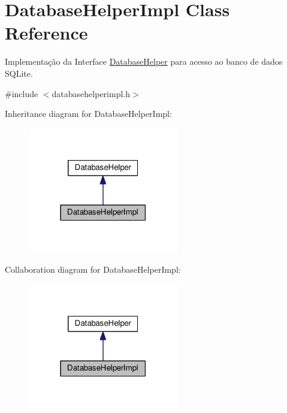 \hypertarget{classDatabaseHelperImpl}{}\section{Database\+Helper\+Impl Class Reference}
\label{classDatabaseHelperImpl}


Implementação da Interface \hyperlink{classDatabaseHelper}{Database\+Helper} para acesso ao banco de dados S\+Q\+Lite.  




{\ttfamily \#include $<$databasehelperimpl.\+h$>$}



Inheritance diagram for Database\+Helper\+Impl\+:\nopagebreak
\begin{figure}[H]
\begin{center}
\leavevmode
\includegraphics[width=186pt]{dd/d1d/classDatabaseHelperImpl__inherit__graph}
\end{center}
\end{figure}


Collaboration diagram for Database\+Helper\+Impl\+:\nopagebreak
\begin{figure}[H]
\begin{center}
\leavevmode
\includegraphics[width=186pt]{d8/da4/classDatabaseHelperImpl__coll__graph}
\end{center}
\end{figure}

